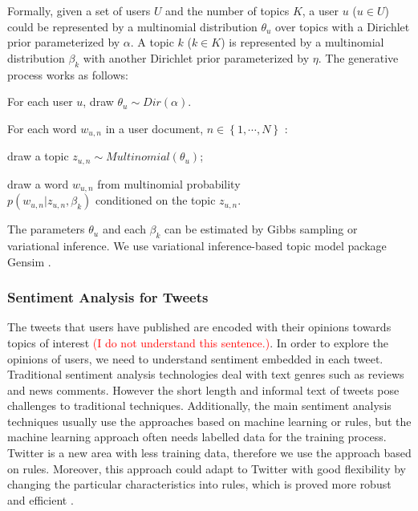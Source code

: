 \documentclass{acm_proc_article-sp}
\newcommand{\mo}[1]{\textcolor{red}{#1}}
\begin{document}
Formally, given a set of users $ U $ and the number of topics $ K $, a user $u$ ($ u \in U $) could be represented by a multinomial distribution $ \theta_{u} $ over topics with a Dirichlet prior parameterized by $ \alpha $. 
A topic $ k $ ($ k \in K $) is represented by a multinomial distribution $ \beta_{k} $ with another Dirichlet prior parameterized by $ \eta $. 
The generative process works as follows:
\begin{itemize*}
\item For each user $ u $, draw $ \theta_{u} \sim Dir \left(  \alpha \right) $.
\item For each word $ w_{u,n} $ in a user document, $ n \in \left\lbrace 1, \cdots, N \right\rbrace $ :
\begin{itemize*}
\item draw a topic $ z_{u,n} \sim Multinomial \left( \theta_{u}  \right) $;
\item draw a word $ w_{u,n} $ from multinomial probability\\ $  p \left( w_{u,n} \vert z_{u,n}, \beta_{k}  \right) $ conditioned on the topic $ z_{u,n} $.
\end{itemize*}
\end{itemize*}
The parameters $ \theta_{u} $ and each $ \beta_{k} $ can be estimated by Gibbs sampling or variational inference.
We use variational inference-based topic model package Gensim \cite{rehurek_lrec}.

\subsubsection{Sentiment Analysis for Tweets}
\label{sentiment}
The tweets that users have published are encoded with their opinions towards topics of interest \mo{(I do not understand this sentence.)}. 
In order to explore the opinions of users, we need to understand sentiment embedded in each tweet.
Traditional sentiment analysis technologies deal with text genres such as reviews and news comments. 
However the short length and informal text of tweets pose challenges to traditional techniques.
Additionally, the main sentiment analysis techniques usually use the approaches based on machine learning or rules, but the machine learning approach often needs labelled data for the training process. Twitter is a new area with less training data, therefore we use the approach based on rules. Moreover, this approach
could adapt to Twitter with good flexibility by changing the particular characteristics into rules, which is proved more robust and efficient \cite{Thelwall:2010SSS,Hu:2013www}.
\end{document}
